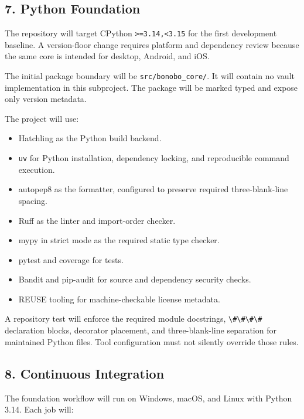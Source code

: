 \documentclass[
  letterpaper,
]{article}
\newcommand{\passthrough}[1]{#1}
\providecommand{\tightlist}{%
  \setlength{\itemsep}{0pt}\setlength{\parskip}{0pt}}
\begin{document}
\subsection{7. Python Foundation}\label{7-python-foundation}

The repository will target CPython \nolinkurl{>=3.14,<3.15} for the first development baseline. A version-floor change
requires platform and dependency review because the same core is intended for desktop, Android, and iOS.

The initial package boundary will be \nolinkurl{src/bonobo_core/}. It will contain no vault implementation in this
subproject. The package will be marked typed and expose only version metadata.

The project will use:

\begin{itemize}
\tightlist
\item
  Hatchling as the Python build backend.
\item
  \passthrough{\lstinline!uv!} for Python installation, dependency locking, and reproducible command execution.
\item
  autopep8 as the formatter, configured to preserve required three-blank-line spacing.
\item
  Ruff as the linter and import-order checker.
\item
  mypy in strict mode as the required static type checker.
\item
  pytest and coverage for tests.
\item
  Bandit and pip-audit for source and dependency security checks.
\item
  REUSE tooling for machine-checkable license metadata.
\end{itemize}

A repository test will enforce the required module docstrings, \passthrough{\lstinline!\#\#\#\#!} declaration blocks,
decorator placement, and three-blank-line separation for maintained Python files. Tool configuration must not silently
override those rules.

\subsection{8. Continuous Integration}\label{8-continuous-integration}

The foundation workflow will run on Windows, macOS, and Linux with Python 3.14. Each job will:
\end{document}
